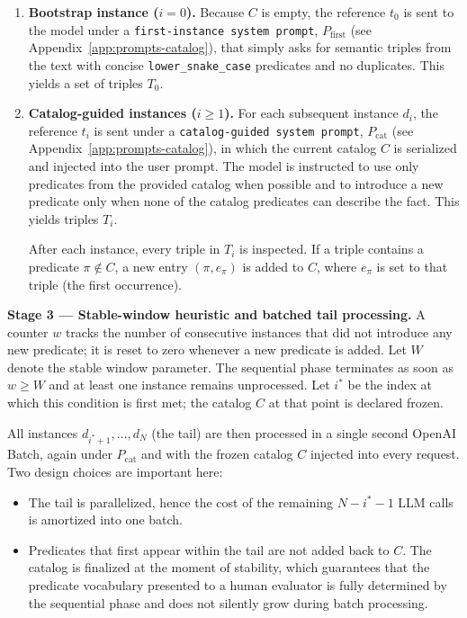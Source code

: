 \begin{enumerate}
  \item \textbf{Bootstrap instance ($i = 0$).} Because $C$ is empty, the reference $t_0$ is sent to the model under a \texttt{first-instance system prompt}, $P_{\mathrm{first}}$ (see Appendix~\ref{app:prompts-catalog}), that simply asks for semantic triples from the text with concise \texttt{lower\_snake\_case} predicates and no duplicates. This yields a set of triples $T_0$.

  \item \textbf{Catalog-guided instances ($i \geq 1$).} For each subsequent instance $d_i$, the reference $t_i$ is sent under a \texttt{catalog-guided system prompt}, $P_{\mathrm{cat}}$ (see Appendix~\ref{app:prompts-catalog}), in which the current catalog $C$ is serialized and injected into the user prompt. The model is instructed to use only predicates from the provided catalog when possible and to introduce a new predicate only when none of the catalog predicates can describe the fact. This yields triples $T_i$.

  After each instance, every triple in $T_i$ is inspected. If a triple contains a predicate $\pi \notin C$, a new entry $(\pi, e_\pi)$ is added to $C$, where $e_\pi$ is set to that triple (the first occurrence).
\end{enumerate}

\textbf{Stage 3 --- Stable-window heuristic and batched tail processing.}
A counter $w$ tracks the number of consecutive instances that did not introduce any new predicate; it is reset to zero whenever a new predicate is added. Let $W$ denote the stable window parameter. The sequential phase terminates as soon as $w \geq W$ and at least one instance remains unprocessed. Let $i^*$ be the index at which this condition is first met; the catalog $C$ at that point is declared frozen.

All instances $d_{i^*+1}, \dots, d_N$ (the tail) are then processed in a single second OpenAI Batch, again under $P_{\mathrm{cat}}$ and with the frozen catalog $C$ injected into every request. Two design choices are important here:

\begin{itemize}
  \item The tail is parallelized, hence the cost of the remaining $N - i^* - 1$ LLM calls is amortized into one batch.
  \item Predicates that first appear within the tail are not added back to $C$. The catalog is finalized at the moment of stability, which guarantees that the predicate vocabulary presented to a human evaluator is fully determined by the sequential phase and does not silently grow during batch processing.
\end{itemize}

